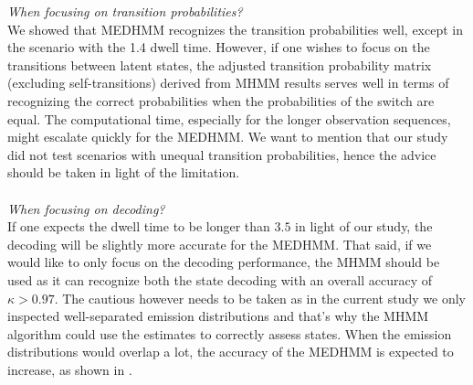 \emph{When focusing on transition probabilities?}\\
We showed that MEDHMM recognizes the transition probabilities well, except in the scenario with the 1.4 dwell time. However, if one wishes to focus on the transitions between latent states, the adjusted transition probability matrix (excluding self-transitions) derived from MHMM results serves well in terms of recognizing the correct probabilities when the probabilities of the switch are equal. The computational time, especially for the longer observation sequences, might escalate quickly for the MEDHMM. 
We want to mention that our study did not test scenarios with unequal transition probabilities, hence the advice should be taken in light of the limitation. \\\\
\emph{When focusing on decoding?}\\ 
If one expects the dwell time to be longer than $3.5$ in light of our study, the decoding will be slightly more accurate for the MEDHMM. That said, if we would like to only focus on the decoding performance, the MHMM should be used as it can recognize both the state decoding with an overall accuracy of $\kappa>0.97$. The cautious however needs to be taken as in the current study we only inspected well-separated emission distributions and that's why the MHMM algorithm could use the estimates to correctly assess states. When the emission distributions would overlap a lot, the accuracy of the MEDHMM is expected to increase, as shown in \cite{Ruiz_Suarez_2022}. 


